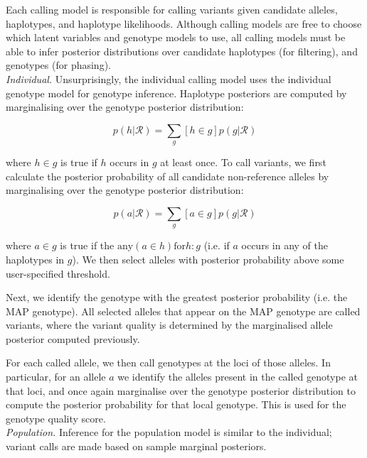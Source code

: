 \documentclass[notitlepage, twocolumn]{article}
\begin{document}
Each calling model is responsible for calling variants given candidate alleles, haplotypes, and haplotype likelihoods. Although calling models are free to choose which latent variables and genotype models to use, all calling models must be able to infer posterior distributions over candidate haplotypes (for filtering), and genotypes (for phasing).\\

\emph{Individual.} Unsurprisingly, the individual calling model uses the individual genotype model for genotype inference. Haplotype posteriors are computed by marginalising over the genotype posterior distribution:

\begin{equation*}
p(h | \mathcal{R}) = \sum_{g} [h \in g]p(g | \mathcal{R})
\end{equation*}

where $h \in g$ is true if $h$ occurs in $g$ at least once. To call variants, we first calculate the posterior probability of all candidate non-reference alleles by marginalising over the genotype posterior distribution:

\begin{equation*}
p(a | \mathcal{R}) = \sum_{g} [a \in g]p(g | \mathcal{R})
\end{equation*}

where $a \in g$ is true if the $\text{any}(a \in h) \text{for} h : g$ (i.e. if $a$ occurs in any of the haplotypes in $g$). We then select alleles with posterior probability above some user-specified threshold.

Next, we identify the genotype with the greatest posterior probability (i.e. the MAP genotype). All selected alleles that appear on the MAP genotype are called variants, where the variant quality is determined by the marginalised allele posterior computed previously.

For each called allele, we then call genotypes at the loci of those alleles. In particular, for an allele $a$ we identify the alleles present in the called genotype at that loci, and once again marginalise over the genotype posterior distribution to compute the posterior probability for that local genotype. This is used for the genotype quality score.\\

\emph{Population.} Inference for the population model is similar to the individual; variant calls are made based on sample marginal posteriors.\\
\end{document}
